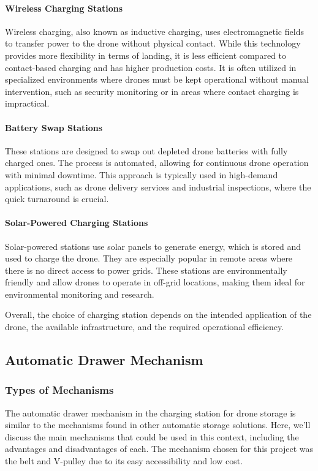     \paragraph{Wireless Charging Stations} Wireless charging, also known as inductive charging, uses electromagnetic fields to transfer power to the drone without physical contact. While this technology provides more flexibility in terms of landing, it is less efficient compared to contact-based charging and has higher production costs. It is often utilized in specialized environments where drones must be kept operational without manual intervention, such as security monitoring or in areas where contact charging is impractical.
    
    \paragraph{Battery Swap Stations} These stations are designed to swap out depleted drone batteries with fully charged ones. The process is automated, allowing for continuous drone operation with minimal downtime. This approach is typically used in high-demand applications, such as drone delivery services and industrial inspections, where the quick turnaround is crucial.
    
    \paragraph{Solar-Powered Charging Stations} Solar-powered stations use solar panels to generate energy, which is stored and used to charge the drone. They are especially popular in remote areas where there is no direct access to power grids. These stations are environmentally friendly and allow drones to operate in off-grid locations, making them ideal for environmental monitoring and research.
    
    Overall, the choice of charging station depends on the intended application of the drone, the available infrastructure, and the required operational efficiency.

\subsection{Automatic Drawer Mechanism}
    \subsubsection{Types of Mechanisms}
    The automatic drawer mechanism in the charging station for drone storage is similar to the mechanisms found in other automatic storage solutions. Here, we'll discuss the main mechanisms that could be used in this context, including the advantages and disadvantages of each. The mechanism chosen for this project was the belt and V-pulley due to its easy accessibility and low cost.
    
